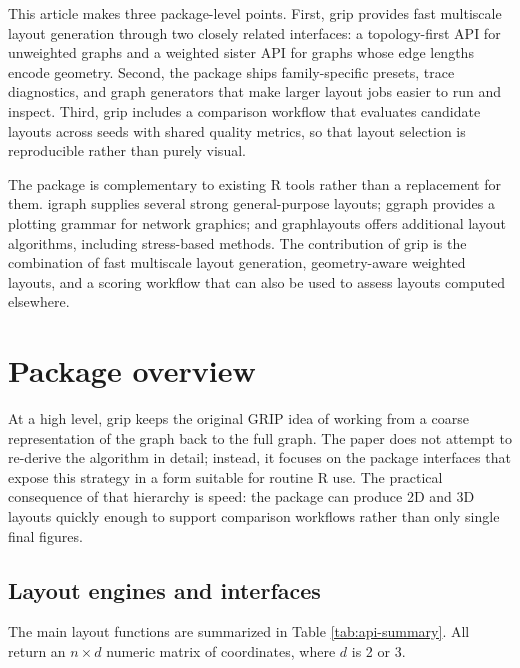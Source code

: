 This article makes three package-level points. First, grip provides fast
multiscale layout generation through two closely related interfaces: a
topology-first API for unweighted graphs and a weighted sister API for graphs
whose edge lengths encode geometry. Second, the package ships family-specific
presets, trace diagnostics, and graph generators that make larger layout jobs
easier to run and inspect. Third, grip includes a comparison workflow that
evaluates candidate layouts across seeds with shared quality metrics, so that
layout selection is reproducible rather than purely visual.

The package is complementary to existing R tools rather than a replacement for
them. igraph \citep{csardi2006} supplies several strong general-purpose layouts;
ggraph \citep{pedersen2024} provides a plotting grammar for network graphics; and
graphlayouts \citep{schoch2023} offers additional layout algorithms, including
stress-based methods. The contribution of grip is the combination of fast
multiscale layout generation, geometry-aware weighted layouts, and a scoring
workflow that can also be used to assess layouts computed elsewhere.

\section{Package overview}\label{package-overview}

At a high level, grip keeps the original GRIP idea of working from a coarse
representation of the graph back to the full graph. The paper does not attempt
to re-derive the algorithm in detail; instead, it focuses on the package
interfaces that expose this strategy in a form suitable for routine R use. The
practical consequence of that hierarchy is speed: the package can produce 2D
and 3D layouts quickly enough to support comparison workflows rather than only
single final figures.

\subsection{Layout engines and interfaces}\label{layout-engines-and-interfaces}

The main layout functions are summarized in Table \ref{tab:api-summary}. All
return an \(n \times d\) numeric matrix of coordinates, where \(d\) is 2 or 3.

